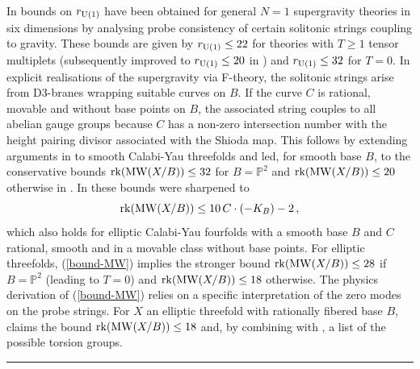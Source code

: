 \documentclass[11pt]{amsart}
\theoremstyle{definition}
\theoremstyle{definition}
\theoremstyle{remark}
\theoremstyle{remark}
\theoremstyle{definition}
\theoremstyle{conjecture}
\newcommand{\MW}{\mathrm{MW}}
\begin{document}
 
 In \cite{Lee:2019skh}  bounds on $r_{\rm U(1)}$ have been obtained for general $N=1$ supergravity theories in six dimensions by analysing probe consistency of certain solitonic strings coupling to gravity. 
 These bounds are given by $r_{\rm U(1)} \leq  22$ for theories with $T\geq 1$ tensor multiplets (subsequently improved  to $r_{\rm U(1)} \leq  20$ in \cite{Kim:2024eoa}) and $r_{\rm U(1)} \leq  32$ for $T =0$. 
  In explicit realisations of the supergravity via F-theory, the solitonic strings arise from
  D3-branes wrapping suitable curves on $B$. If the curve $C$ is rational, movable  and without base points on $B$, the associated string couples to all abelian gauge groups because $C$ has a non-zero intersection number with the height pairing divisor associated with the Shioda map. This follows by extending arguments in \cite{CoxZucker1979} to smooth Calabi-Yau threefolds \cite{Lee:2018ihr} and led, for smooth base $B$, to the conservative bounds 
  ${\rm rk}(\MW(X/B)) \leq 32$ for $B = \mathbb P^2$ and ${\rm rk}(\MW(X/B)) \leq 20$ otherwise in \cite{Lee:2019skh}. In \cite{Martucci:2022krl} these bounds were sharpened 
   to 
   \begin{equation} \label{bound-MW}
   {\rm rk}(\MW(X/B)) \leq 10\,  C \cdot (-K_B) -2 \,,
   \end{equation}
 which also holds for elliptic Calabi-Yau fourfolds with a smooth base $B$ and $C$ rational, smooth and in a movable class without base points. 
  For elliptic threefolds, (\ref{bound-MW}) implies  
the stronger bound ${\rm rk}(\MW(X/B)) \leq 28$ if $B = \mathbb P^2$ (leading to $T=0$) and  
${\rm rk}(\MW(X/B)) \leq 18$ otherwise. 
 The physics derivation of (\ref{bound-MW}) relies on a specific interpretation of the zero modes on the probe strings. For $X$ an elliptic threefold  with rationally fibered base $B$, \cite{Lee:2022swr} claims the bound ${\rm rk}(\MW(X/B)) \leq 18$ 
 and, by combining with \cite{HajoujiOehlmann}, a list of the possible torsion groups.




 \bigskip
 
 \hrule

\bigskip


 
 

%  
%
%
 
\end{document}
